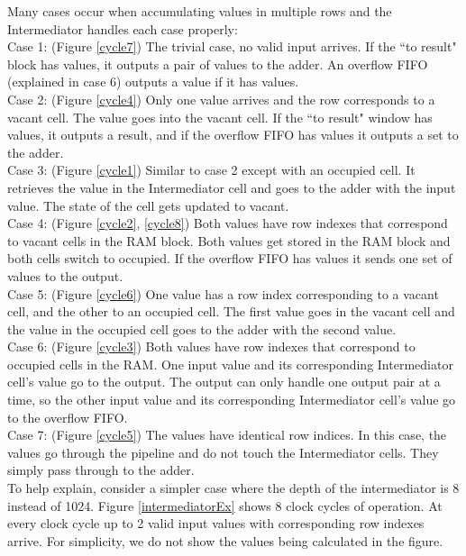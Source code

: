 \par Many cases occur when accumulating values in multiple rows and the Intermediator handles each case properly:
\\\indent Case 1: (Figure \ref{cycle7}) The trivial case, no valid input arrives. If the ``to result" block has values, it outputs a pair of values to the adder. An overflow FIFO (explained in case 6) outputs a value if it has values.
\\\indent Case 2: (Figure \ref{cycle4}) Only one value arrives and the row corresponds to a vacant cell. The value goes into the vacant cell. If the ``to result" window has values, it outputs a result, and if the overflow FIFO has values it outputs a set to the adder.
\\\indent Case 3: (Figure \ref{cycle1}) Similar to case 2 except with an occupied cell. It retrieves the value in the Intermediator cell and goes to the adder with the input value. The state of the cell gets updated to vacant.
\\\indent Case 4: (Figure \ref{cycle2}, \ref{cycle8}) Both values have row indexes that correspond to vacant cells in the RAM block. Both values get stored in the RAM block and both cells switch to occupied. If the overflow FIFO has values it sends one set of values to the output. 
\\\indent Case 5: (Figure \ref{cycle6}) One value has a row index corresponding to a vacant cell, and the other to an occupied cell. The first value goes in the vacant cell and the value in the occupied cell goes to the adder with the second value. 
\\\indent Case 6: (Figure \ref{cycle3}) Both values have row indexes that correspond to occupied cells in the RAM. One input value and its corresponding Intermediator cell's value go to the output. The output can only handle one output pair at a time, so the other input value and its corresponding Intermediator cell's value go to the overflow FIFO.
\\\indent Case 7: (Figure \ref{cycle5}) The values have identical row indices. In this case, the values go through the pipeline and do not touch the Intermediator cells. They simply pass through to the adder.\\
%
To help explain, consider a simpler case where the depth of the intermediator is 8 instead of 1024. Figure \ref{intermediatorEx} shows 8 clock cycles of operation. At every clock cycle up to 2 valid input values with corresponding row indexes arrive. For simplicity, we do not show the values being calculated in the figure.
